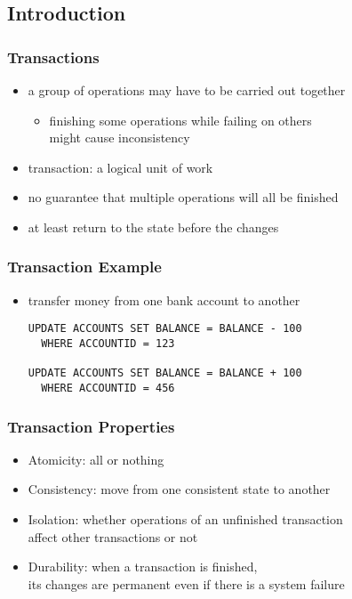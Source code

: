 \documentclass[dvipsnames]{beamer}
\theoremstyle{plain}
\begin{document}
\subsection{Introduction}

\begin{frame}
  \frametitle{Transactions}

  \begin{itemize}
    \item a group of operations may have to be carried out together
    \begin{itemize}
      \item finishing some operations while failing on others\\
	might cause inconsistency
    \end{itemize}
    \item \alert{transaction}: a logical unit of work

    \pause
    \medskip
    \item no guarantee that multiple operations will all be finished
    \item at least return to the state before the changes
  \end{itemize}
\end{frame}

\begin{frame}[fragile]
  \frametitle{Transaction Example}

  \begin{itemize}
    \item transfer money from one bank account to another

    \medskip
    \begin{lstlisting}
UPDATE ACCOUNTS SET BALANCE = BALANCE - 100
  WHERE ACCOUNTID = 123

UPDATE ACCOUNTS SET BALANCE = BALANCE + 100
  WHERE ACCOUNTID = 456
    \end{lstlisting}
  \end{itemize}
\end{frame}

\begin{frame}
  \frametitle{Transaction Properties}

  \begin{itemize}
    \item \alert{A}tomicity: all or nothing

    \pause
    \medskip
    \item \alert{C}onsistency: move from one consistent state to another

    \pause
    \medskip
    \item \alert{I}solation: whether operations of an unfinished transaction\\
      affect other transactions or not

    \pause
    \medskip
    \item \alert{D}urability: when a transaction is finished,\\
      its changes are permanent even if there is a system failure
  \end{itemize}
\end{frame}
\end{document}

